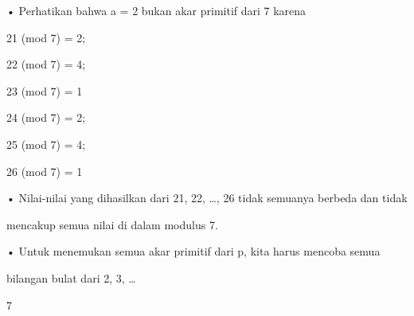 \documentclass{article}
\begin{document}

• Perhatikan bahwa a = 2 bukan akar primitif dari 7 karena 

21 (mod 7) = 2;

22 (mod 7) = 4;

23 (mod 7) = 1

24 (mod 7) = 2;

25 (mod 7) = 4;

26 (mod 7) = 1

• Nilai-nilai yang dihasilkan dari 21, 22, …, 26 tidak semuanya berbeda dan tidak 

mencakup semua nilai di dalam modulus 7.

• Untuk menemukan semua akar primitif dari p, kita harus mencoba semua 

bilangan bulat dari 2, 3, …  

7
\end{document}
